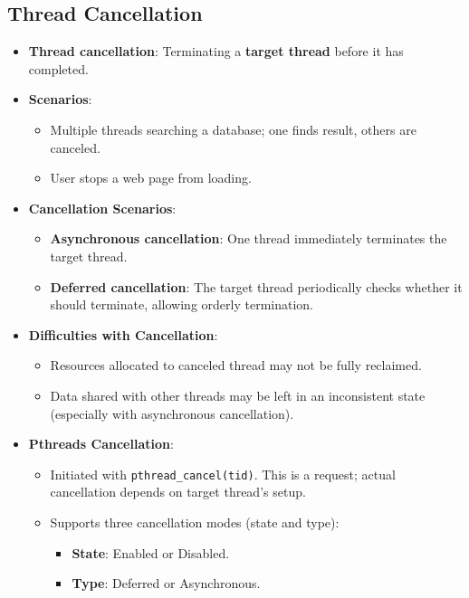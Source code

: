 \subsection{Thread Cancellation}
\begin{itemize}
    \item \textbf{Thread cancellation}: Terminating a \textbf{target thread} before it has completed.
    \item \textbf{Scenarios}:
        \begin{itemize}
            \item Multiple threads searching a database; one finds result, others are canceled.
            \item User stops a web page from loading.
        \end{itemize}
    \item \textbf{Cancellation Scenarios}:
        \begin{itemize}
            \item \textbf{Asynchronous cancellation}: One thread immediately terminates the target thread.
            \item \textbf{Deferred cancellation}: The target thread periodically checks whether it should terminate, allowing orderly termination.
        \end{itemize}
    \item \textbf{Difficulties with Cancellation}:
        \begin{itemize}
            \item Resources allocated to canceled thread may not be fully reclaimed.
            \item Data shared with other threads may be left in an inconsistent state (especially with asynchronous cancellation).
        \end{itemize}
    \item \textbf{Pthreads Cancellation}:
        \begin{itemize}
            \item Initiated with \texttt{pthread\_cancel(tid)}. This is a request; actual cancellation depends on target thread's setup.
            \item Supports three cancellation modes (state and type):
                \begin{itemize}
                    \item \textbf{State}: Enabled or Disabled.
                    \item \textbf{Type}: Deferred or Asynchronous.
                \end{itemize}

\end{itemize}
\end{itemize}
